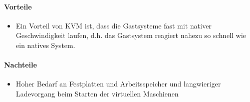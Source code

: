 \paragraph{Vorteile}
\begin{itemize}
	\item Ein Vorteil von KVM ist, dass die Gastsysteme fast mit nativer Geschwindigkeit laufen, d.h. das Gastsystem reagiert nahezu so schnell wie ein natives System. 
\end{itemize}
\paragraph{Nachteile}
\begin{itemize}
	\item Hoher Bedarf an Festplatten und Arbeitsspeicher und langwieriger Ladevorgang beim Starten der virtuellen Maschienen
\end{itemize}


